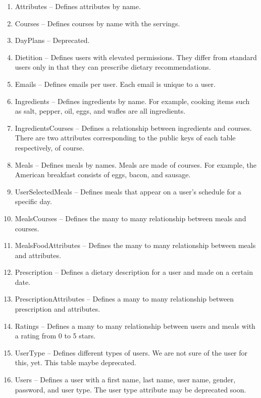 \begin{enumerate}
\item Attributes
-- Defines attributes by name.
\item Courses
-- Defines courses by name with the servings.
\item DayPlans
-- Deprecated.
\item Dietition
-- Defines users with elevated permissions.
They differ from standard users only in that they can prescribe dietary
recommendations.
\item Emails
-- Defines emails per user.
Each email is unique to a user.
\item Ingredients
-- Defines ingredients by name.
For example,
cooking items such as salt, pepper, oil, eggs, and wafles are all ingredients.
\item IngredientsCourses
-- Defines a relationship between ingredients and courses.
There are two attributes corresponding to the public keys of
each table respectively, of course.
\item Meals
-- Defines meals by names.
Meals are made of courses.
For example,
the American breakfast consists of eggs, bacon, and sausage.
\item UserSelectedMeals
-- Defines meals that appear on a user's schedule for a specific day.
\item MealsCourses
-- Defines the many to many relationship between meals and courses.
\item MealsFoodAttributes
-- Defines the many to many relationship between meals and attributes.
\item Prescription
-- Defines a dietary description for a user and made on a certain date.
\item PrescriptionAttributes
-- Defines a many to many relationship between prescription and attributes.
\item Ratings
-- Defines a many to many relationship between users and meals with a rating from 0 to 5 stars.
\item UserType
-- Defines different types of users.
We are not sure of the user for this, yet.
This table maybe deprecated.
\item Users
-- Defines a user with a first name, last name, user name, gender,
password, and user type.
The user type attribute may be deprecated soon.

\end{enumerate}
